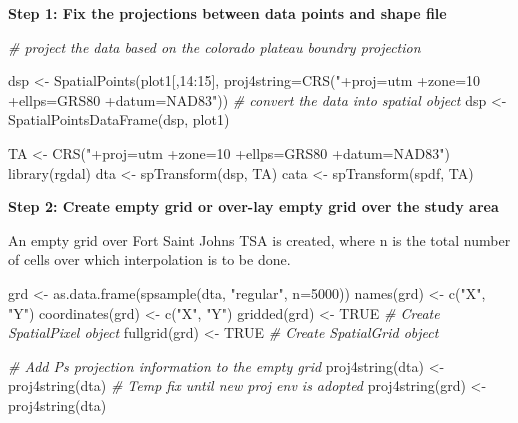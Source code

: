 \documentclass[
]{book}
\newenvironment{Shaded}{\begin{snugshade}}{\end{snugshade}}
\newcommand{\AttributeTok}[1]{\textcolor[rgb]{0.77,0.63,0.00}{#1}}
\newcommand{\CommentTok}[1]{\textcolor[rgb]{0.56,0.35,0.01}{\textit{#1}}}
\newcommand{\ConstantTok}[1]{\textcolor[rgb]{0.00,0.00,0.00}{#1}}
\newcommand{\DecValTok}[1]{\textcolor[rgb]{0.00,0.00,0.81}{#1}}
\newcommand{\FunctionTok}[1]{\textcolor[rgb]{0.00,0.00,0.00}{#1}}
\newcommand{\NormalTok}[1]{#1}
\newcommand{\OtherTok}[1]{\textcolor[rgb]{0.56,0.35,0.01}{#1}}
\newcommand{\SpecialCharTok}[1]{\textcolor[rgb]{0.00,0.00,0.00}{#1}}
\newcommand{\StringTok}[1]{\textcolor[rgb]{0.31,0.60,0.02}{#1}}
\begin{document}
\textbf{Step 1: Fix the projections between data points and shape file}

\begin{Shaded}
\begin{Highlighting}[]
\CommentTok{\# project the data based on the colorado plateau boundry projection}

\NormalTok{dsp }\OtherTok{\textless{}{-}} \FunctionTok{SpatialPoints}\NormalTok{(plot1[,}\DecValTok{14}\SpecialCharTok{:}\DecValTok{15}\NormalTok{], }\AttributeTok{proj4string=}\FunctionTok{CRS}\NormalTok{(}\StringTok{"+proj=utm +zone=10 +ellps=GRS80 +datum=NAD83"}\NormalTok{))}
\CommentTok{\# convert the data into spatial object}
\NormalTok{dsp }\OtherTok{\textless{}{-}} \FunctionTok{SpatialPointsDataFrame}\NormalTok{(dsp, plot1)}

\NormalTok{TA }\OtherTok{\textless{}{-}} \FunctionTok{CRS}\NormalTok{(}\StringTok{"+proj=utm +zone=10 +ellps=GRS80 +datum=NAD83"}\NormalTok{)}
\FunctionTok{library}\NormalTok{(rgdal)}
\NormalTok{dta }\OtherTok{\textless{}{-}} \FunctionTok{spTransform}\NormalTok{(dsp, TA)}
\NormalTok{cata }\OtherTok{\textless{}{-}} \FunctionTok{spTransform}\NormalTok{(spdf, TA)}
\end{Highlighting}
\end{Shaded}

\textbf{Step 2: Create empty grid or over-lay empty grid over the study area}

An empty grid over Fort Saint Johns TSA is created, where n is the total number of cells over which interpolation is to be done.

\begin{Shaded}
\begin{Highlighting}[]
\NormalTok{grd              }\OtherTok{\textless{}{-}} \FunctionTok{as.data.frame}\NormalTok{(}\FunctionTok{spsample}\NormalTok{(dta, }\StringTok{"regular"}\NormalTok{, }\AttributeTok{n=}\DecValTok{5000}\NormalTok{))}
\FunctionTok{names}\NormalTok{(grd)       }\OtherTok{\textless{}{-}} \FunctionTok{c}\NormalTok{(}\StringTok{"X"}\NormalTok{, }\StringTok{"Y"}\NormalTok{)}
\FunctionTok{coordinates}\NormalTok{(grd) }\OtherTok{\textless{}{-}} \FunctionTok{c}\NormalTok{(}\StringTok{"X"}\NormalTok{, }\StringTok{"Y"}\NormalTok{)}
\FunctionTok{gridded}\NormalTok{(grd)     }\OtherTok{\textless{}{-}} \ConstantTok{TRUE}  \CommentTok{\# Create SpatialPixel object}
\FunctionTok{fullgrid}\NormalTok{(grd)    }\OtherTok{\textless{}{-}} \ConstantTok{TRUE}  \CommentTok{\# Create SpatialGrid object}

\CommentTok{\# Add P\textquotesingle{}s projection information to the empty grid}
\FunctionTok{proj4string}\NormalTok{(dta) }\OtherTok{\textless{}{-}} \FunctionTok{proj4string}\NormalTok{(dta) }\CommentTok{\# Temp fix until new proj env is adopted}
\FunctionTok{proj4string}\NormalTok{(grd) }\OtherTok{\textless{}{-}} \FunctionTok{proj4string}\NormalTok{(dta)}
\end{Highlighting}
\end{Shaded}
\end{document}
